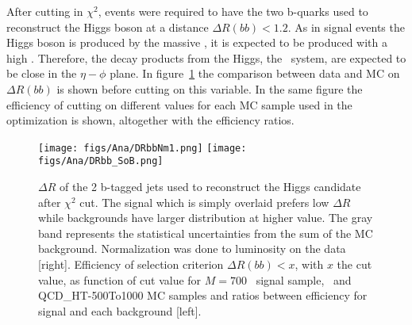 After cutting in $\chi^{2}$, events were required to have the two b-quarks used to reconstruct the Higgs boson at a distance $\Delta R(bb)<1.2$. As in signal events the Higgs boson is produced by the massive \Tp, it is expected to be produced with a high \pt. Therefore, the decay products from the Higgs, the \bbbar~system, are expected to be close in the $\eta-\phi$ plane. In figure~\ref{fig:DRbb} the comparison between data and MC on $\Delta R(bb)$ is shown before cutting on this variable. In the same figure the efficiency of cutting on different values for each MC sample used in the optimization is shown, altogether with the efficiency ratios. %

\begin{figure}[!Hhtbp]
  \begin{center}
    \texttt{[image: figs/Ana/DRbbNm1.png]}
    \texttt{[image: figs/Ana/DRbb\_SoB.png]}
    \caption{$\Delta R$ of the 2 b-tagged jets used to reconstruct the Higgs candidate after $\chi^{2}$ cut. The signal which is simply overlaid prefers low $\Delta R$ while backgrounds have larger distribution at higher value. The gray band represents the statistical uncertainties from the sum of the MC background. Normalization was done to luminosity on the data [right]. Efficiency of selection criterion $\Delta R(bb)<x$, with $x$ the cut value, as function of cut value for $M=700$ \GeVcc~signal sample, \ttbar~and QCD\_HT-500To1000 MC samples and ratios between efficiency for signal and each background [left].}
    \label{fig:DRbb}
  \end{center}
\end{figure}

